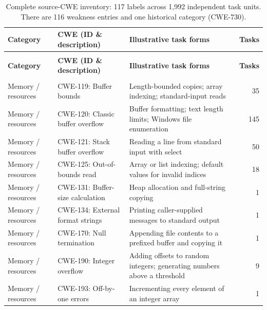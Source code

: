 \begingroup\small\setlength{\tabcolsep}{3pt}\renewcommand{\arraystretch}{1.14}
\begin{longtable}{@{}>{\raggedright\arraybackslash}p{.13\linewidth} >{\raggedright\arraybackslash}p{.25\linewidth} >{\raggedright\arraybackslash}p{} r@{}}
\caption{Complete source-CWE inventory: 117 labels across 1,992 independent task units. There are 116 weakness entries and one historical category (CWE-730).}
\label{tab:cwe-task-forms-appendix}\\
\toprule
\textbf{Category} & \textbf{CWE (ID \& description)} & \textbf{Illustrative task forms} & \textbf{Tasks} \\
\midrule
\endfirsthead
\multicolumn{4}{@{}l}{\textit{Table \thetable\ continued}}\\
\toprule
\textbf{Category} & \textbf{CWE (ID \& description)} & \textbf{Illustrative task forms} & \textbf{Tasks} \\
\midrule
\endhead
\midrule\multicolumn{4}{r@{}}{\footnotesize Continued on next page}\\
\endfoot
\bottomrule
\endlastfoot
Memory / resources & CWE-119: Buffer bounds & Length-bounded copies; array indexing; standard-input reads & 35 \\
Memory / resources & CWE-120: Classic buffer overflow & Buffer formatting; text length limits; Windows file enumeration & 145 \\
Memory / resources & CWE-121: Stack buffer overflow & Reading a line from standard input with select & 50 \\
Memory / resources & CWE-125: Out-of-bounds read & Array or list indexing; default values for invalid indices & 18 \\
Memory / resources & CWE-131: Buffer-size calculation & Heap allocation and full-string copying & 1 \\
Memory / resources & CWE-134: External format strings & Printing caller-supplied messages to standard output & 1 \\
Memory / resources & CWE-170: Null termination & Appending file contents to a prefixed buffer and copying it & 1 \\
Memory / resources & CWE-190: Integer overflow & Adding offsets to random integers; generating numbers above a threshold & 9 \\
Memory / resources & CWE-193: Off-by-one errors & Incrementing every element of an integer array & 1 \\

\end{longtable}
